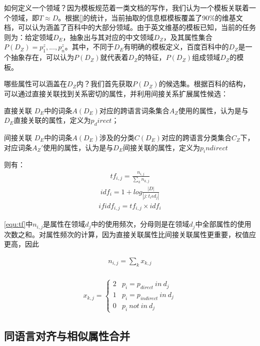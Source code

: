 如何定义一个领域？因为模板规范着一类文档的写作，我们认为一个模板关联着一个领域，即$T \approx D$。根据\ref{}的统计，当前抽取的信息框模板覆盖了90\%的维基文档，可以认为涵盖了百科中的大部分领域。由于英文维基的模板已知，当前的任务则为：给定领域$D_E$，抽象出与其对应的中文领域$D_Z$，及其属性集合$P(D_Z)={p_1^z,...,p_n^z}$。其中，不同于$D_E$有明确的模板定义，百度百科中的$D_Z$是一个抽象存在，可以认为$P(D_Z)$就代表着$D_Z$的特征，$P(D_Z)$组成领域$D_Z$的模板。

哪些属性可以涵盖在$D_Z$内？我们首先获取$P(D_Z)$的候选集。根据百科的结构，可以通过直接关联找到关系密切的属性，并利用间接关系扩展属性候选：

{\heiti 直接关联} $D_E$中的词条$A(D_E)$对应的跨语言词条集合$A_Z$使用的属性，认为是与$D_E$直接关联的属性，定义为$p_direct$；

{\heiti 间接关联} $D_E$中的词条$A(D_E)$涉及的分类$C(D_E)$对应的跨语言分类集合$C_Z$下，对应词条$A_Z'$使用的属性，认为是与$D_E$间接关联的属性，定义为$p_indirect$

则有：
\begin{align}
\label{equ:tf}
tf_{i,j}=\frac{n_{i,j}}{\sum_{k}{n_{k,j}}} 
\end{align}
\begin{align}
\label{equ:idf}
idf_{i}=1+log\frac{\left | D \right |}{\left | j:t_i  \epsilon d_j \right |} 
\end{align}
\begin{align}
\label{equ:tfidf}
ifidf_{i,j}=tf_{i,j}\times idf_{i}
\end{align}

\ref{equ:tf}中$n_{i,j}$是属性在领域$d_{j}$中的使用频次，分母则是在领域$d_{j}$中全部属性的使用次数之和。对属性频次的计算，因为直接关联属性比间接关联属性更重要，权值应更高，因此

\begin{align}
n_{i,j} = {\sum_{k}{x_{k,j}}}\\
\end{align}

\begin{align}
x_{k,j} = 
\left\{\begin{matrix}
2 & p_i = p_{direct} \ in \ d_j\\
1 & p_i = p_{indirect} \ in \ d_j\\
0 & p_i \ not \ in \ d_j
\end{matrix}\right.
\end{align}

\subsection{同语言对齐与相似属性合并}
\label{sec:similar-property}

